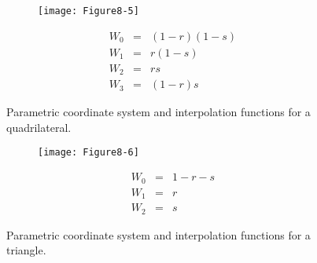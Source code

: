\begin{description}[leftmargin=0cm,labelindent=0cm]
    \begin{figure}[!htb]
        \centering
        \begin{subfigure}{0.48\linewidth}
            \centering
            \texttt{[image: Figure8-5]}
            \caption*{}
        \end{subfigure}
        \hfill
        \begin{subfigure}{0.48\linewidth}
            \centering
            \begin{equation*}
            \begin{array}{lll}
            W_0 &=& (1-r)(1 - s) \\
            W_1 &=& r(1 - s) \\
            W_2 &=& r s \\
            W_3 &=& (1 - r)s
            \end{array}
            \end{equation*}
        \end{subfigure}%
        \caption{Parametric coordinate system and interpolation functions for a quadrilateral.}
        \label{fig:Figure8-5}
    \end{figure}

    \begin{figure}[!htb]
        \centering
        \begin{subfigure}{0.48\linewidth}
            \centering
            \texttt{[image: Figure8-6]}
            \caption*{}
        \end{subfigure}
        \hfill
        \begin{subfigure}{0.48\linewidth}
            \centering
            \begin{equation*}
            \begin{array}{lll}
            W_0 &=& 1 - r - s \\
            W_1 &=& r \\
            W_2 &=& s
            \end{array}
            \end{equation*}
        \end{subfigure}%
        \caption{Parametric coordinate system and interpolation functions for a triangle.}
        \label{fig:Figure8-6}
    \end{figure}


\end{description}
